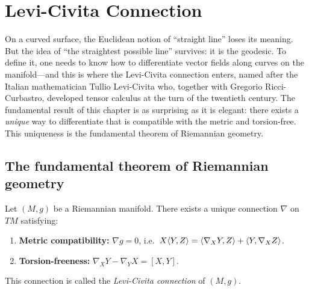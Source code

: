 \chapter{Levi-Civita Connection}
\label{ch:levi_civita}

On a curved surface, the Euclidean notion of ``straight line'' loses its meaning. But the idea of ``the straightest possible line'' survives: it is the geodesic. To define it, one needs to know how to differentiate vector fields along curves on the manifold---and this is where the Levi-Civita connection enters, named after the Italian mathematician Tullio Levi-Civita who, together with Gregorio Ricci-Curbastro, developed tensor calculus at the turn of the twentieth century. The fundamental result of this chapter is as surprising as it is elegant: there exists a \emph{unique} way to differentiate that is compatible with the metric and torsion-free. This uniqueness is the fundamental theorem of Riemannian geometry.

\section{The fundamental theorem of Riemannian geometry}

\begin{theorem}
\label{thm:levi_civita}
Let $(M, g)$ be a Riemannian manifold. There exists a unique connection $\nabla$
on $TM$ satisfying:
\begin{enumerate}
    \item \textbf{Metric compatibility:} $\nabla g = 0$, i.e.\
    $X\langle Y, Z \rangle = \langle \nabla_X Y, Z \rangle + \langle Y, \nabla_X Z \rangle$.
    \item \textbf{Torsion-freeness:} $\nabla_X Y - \nabla_Y X = [X, Y]$.
\end{enumerate}
This connection is called the \emph{Levi-Civita connection} of $(M, g)$.
\end{theorem}

